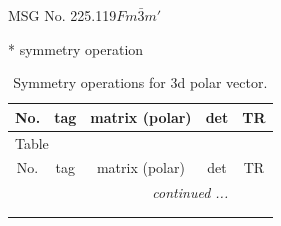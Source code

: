 \documentclass[fleqn,8pt]{jsarticle}
\begin{document}
\setcounter{MaxMatrixCols}{32}

\renewcommand{\tablename}{Table~}
\renewcommand{\figurename}{Figure~}
\begin{center}
\LARGE
MSG No. 225.119\quad$Fm\bar{3}m'$
\end{center}
* symmetry operation
\renewcommand{\arraystretch}{1.3}
\begin{longtable}{ccccc}
\caption{Symmetry operations for 3d polar vector.}
 \\
 \hline \hline
No. & tag & matrix (polar) & det & TR \\ \hline \endfirsthead

\multicolumn{4}{l}{\tablename\ \thetable{}} \\
 \hline \hline
No. & tag & matrix (polar) & det & TR \\ \hline \endhead

 \hline \hline
\multicolumn{4}{r}{\footnotesize\it continued ...} \\ \endfoot

 \hline \hline
\multicolumn{4}{r}{} \\ \endlastfoot


\end{longtable}
\end{document}
